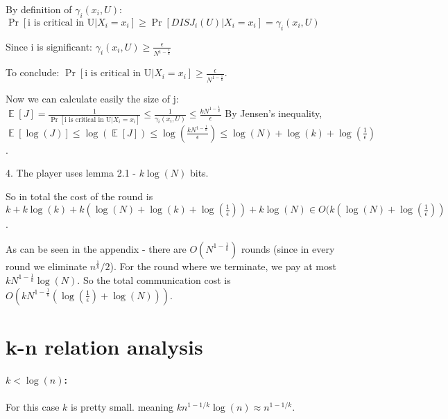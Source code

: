 \documentclass{article}
\theoremstyle{plain}
\begin{document}
By definition of $\gamma_i(x_i, U)$: \newline
$\Pr[\text{i is critical in U}| X_i = x_i] \geq \Pr[DISJ_i(U) | X_i = x_i] = \gamma_i(x_i, U) $\newline

Since i is significant: \newline
$\gamma_i(x_i, U) \geq \frac{\epsilon}{N^{1-\frac{1}{k}}}$ \newline

To conclude: $\Pr[\text{i is critical in U}| X_i = x_i] \geq \frac{\epsilon}{N^{1-\frac{1}{k}}}$. \newline

Now we can calculate easily the size of j: \newline
$ \mathop{\mathbb{E}} [J] = \frac{1}{\Pr[\text{i is critical in U}| X_i = x_i]} \leq \frac{1}{\gamma_i(x_i, U)} \leq \frac{kN^{1-\frac{1}{k}}}{\epsilon}$ \newline
By Jensen's inequality, $\mathop{\mathbb{E}} [\log(J)] \leq \log(\mathop{\mathbb{E}} [J]) \leq \log(\frac{kN^{1-\frac{1}{k}}}{\epsilon}) \leq \log(N) + \log(k) + \log(\frac{1}{\epsilon})$.  \newline

4. The player uses lemma 2.1 - $k\log(N)$ bits.

So in total the cost of the round is $k + k\log(k) + k(\log(N) + \log(k) + \log(\frac{1}{\epsilon})) + k\log(N) \in O(k(\log(N) + \log(\frac{1}{\epsilon}))$.

As can be seen in the appendix - there are $O(N^{1-\frac{1}{k}})$ rounds (since in every round we eliminate $n^{\frac{1}{k}}/2$). \newline
For the round where we terminate, we pay at most $kN^{1-\frac{1}{k}} \log(N)$. \newline
So the total communication cost is  $O(kN^{1-\frac{1}{k}}(\log(\frac{1}{\epsilon}) + \log(N)))$.
\section{k-n relation analysis}
\paragraph{$k < \log(n)$:}
For this case $k$ is pretty small. meaning $kn^{1-1/k}\log(n) \approx n^{1-1/k}$. 
\end{document}
